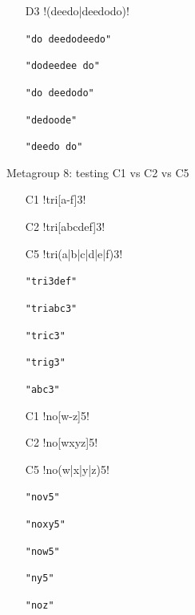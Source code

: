 \begin{footnotesize}
\begin{multicols}{2}
\begin{itemize}[noitemsep,topsep=0pt]
\item[D3] \cverb!(deedo|deedodo)!
\item[] \verb|"do deedodeedo"|
\item[] \verb|"dodeedee do"|
\item[] \verb|"do deedodo"|
\item[] \verb|"dedoode"|
\item[] \verb|"deedo do"|
\end{itemize}
\end{multicols}
\vspace{-2mm}
Metagroup 8: testing C1 vs C2 vs C5
\vspace{-5mm}
\begin{multicols}{2}
\begin{itemize}[noitemsep,topsep=0pt]
\item[C1] \cverb!tri[a-f]3!
\item[C2] \cverb!tri[abcdef]3!
\item[C5] \cverb!tri(a|b|c|d|e|f)3!
\item[] \verb|"tri3def"|
\item[] \verb|"triabc3"|
\item[] \verb|"tric3"|
\item[] \verb|"trig3"|
\item[] \verb|"abc3"|
\item[C1] \cverb!no[w-z]5!
\item[C2] \cverb!no[wxyz]5!
\item[C5] \cverb!no(w|x|y|z)5!
\item[] \verb|"nov5"|
\item[] \verb|"noxy5"|
\item[] \verb|"now5"|
\item[] \verb|"ny5"|
\item[] \verb|"noz"|
\end{itemize}
\end{multicols}
\pagebreak


\end{footnotesize}
